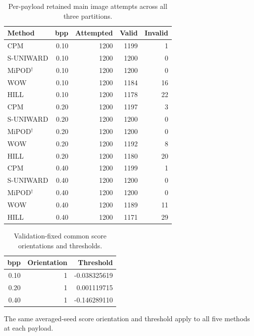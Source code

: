 \documentclass[journal]{IEEEtran}
\renewcommand{\arraystretch}{1.2}
\renewcommand{\arraystretch}{1.0}
\theoremstyle{definition}
\theoremstyle{game}
\renewcommand{\arraystretch}{1.5}
\begin{document}
\begin{table}[!t]
\centering\footnotesize
\caption{Per-payload retained main image attempts across all three partitions.}
\label{tab:hsm-images}
\setlength{\tabcolsep}{4pt}\renewcommand{\arraystretch}{1.15}
\begin{tabular}{lrrrr}
\toprule
Method & bpp & Attempted & Valid & Invalid\\
\midrule
CPM & 0.10 & 1200 & 1199 & 1\\
S-UNIWARD & 0.10 & 1200 & 1200 & 0\\
MiPOD$^\dagger$ & 0.10 & 1200 & 1200 & 0\\
WOW & 0.10 & 1200 & 1184 & 16\\
HILL & 0.10 & 1200 & 1178 & 22\\
CPM & 0.20 & 1200 & 1197 & 3\\
S-UNIWARD & 0.20 & 1200 & 1200 & 0\\
MiPOD$^\dagger$ & 0.20 & 1200 & 1200 & 0\\
WOW & 0.20 & 1200 & 1192 & 8\\
HILL & 0.20 & 1200 & 1180 & 20\\
CPM & 0.40 & 1200 & 1199 & 1\\
S-UNIWARD & 0.40 & 1200 & 1200 & 0\\
MiPOD$^\dagger$ & 0.40 & 1200 & 1200 & 0\\
WOW & 0.40 & 1200 & 1189 & 11\\
HILL & 0.40 & 1200 & 1171 & 29\\
\bottomrule
\end{tabular}

\end{table}

\begin{table}[!t]
\centering\footnotesize
\caption{Validation-fixed common score orientations and thresholds.}
\label{tab:hsm-thresholds}
\setlength{\tabcolsep}{4pt}\renewcommand{\arraystretch}{1.15}
\begin{tabular}{rrr}
\toprule
bpp & Orientation & Threshold\\
\midrule
0.10 & 1 & -0.038325619\\
0.20 & 1 & 0.001119715\\
0.40 & 1 & -0.146289110\\
\bottomrule
\end{tabular}
\par\smallskip\parbox{.97\textwidth}{\footnotesize The same averaged-seed score orientation and threshold apply to all five methods at each payload.}
\end{table}
\end{document}
